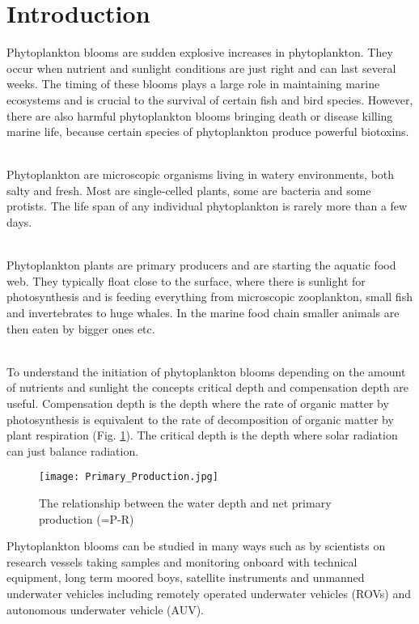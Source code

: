 \documentclass[../Main.tex]{subfiles}
\begin{document}
\section*{\crule[blue]{.3cm}{.3cm} Introduction}
Phytoplankton blooms are sudden explosive increases in phytoplankton. 
They occur when nutrient and sunlight conditions are just right and can last several weeks. 
The timing of these blooms plays a large role in maintaining marine ecosystems and is crucial to the survival of certain fish and bird species. 
However, there are also harmful phytoplankton blooms bringing death or disease killing marine life, because certain species of phytoplankton produce powerful biotoxins.

\\
Phytoplankton are microscopic organisms living in watery environments, both salty and fresh. 
Most are single-celled plants, some are bacteria and some protists. 
The life span of any individual phytoplankton is rarely more than a few days.

\\
Phytoplankton plants are primary producers and are starting the aquatic food web. 
They typically float close to the surface, where there is sunlight for photosynthesis and is feeding everything from microscopic zooplankton, small fish and invertebrates to huge whales. In the marine food chain smaller animals are then eaten by bigger ones etc. \supercite{Prim2021}

\\
To understand the initiation of phytoplankton blooms depending on the amount of nutrients and sunlight the concepts critical depth and compensation depth are useful. 
Compensation depth is the depth where the rate of organic matter by photosynthesis is equivalent to the rate of decomposition of organic matter by plant respiration (Fig. \ref{fig:prim}).
The critical depth is the depth where solar radiation can just balance radiation.\supercite{Sverdrup1953OnCF}
\begin{figure}[H]
\texttt{[image: Primary\_Production.jpg]}
\label{fig:prim}
\caption{The relationship between the water depth and net primary production (=P-R) \supercite{Nasa2021}}
\end{figure}
Phytoplankton blooms can be studied in many ways such as by scientists on research vessels taking samples and monitoring onboard with technical equipment, long term moored boys, satellite instruments and unmanned underwater vehicles including remotely operated underwater vehicles (ROVs) and autonomous underwater vehicle (AUV). 
\end{document}
